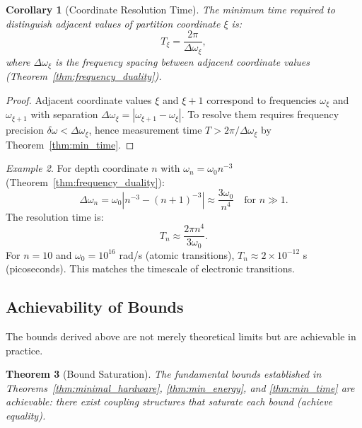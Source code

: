 \documentclass[twocolumn,10pt,a4paper]{article}
\newtheorem{theorem}{Theorem}[section]
\newtheorem{corollary}[theorem]{Corollary}
\theoremstyle{remark}
\newtheorem{example}[theorem]{Example}
\begin{document}
\begin{corollary}[Coordinate Resolution Time]
\label{cor:coord_time}
The minimum time required to distinguish adjacent values of partition coordinate $\xi$ is:
\begin{equation}
T_\xi = \frac{2\pi}{\Delta\omega_\xi},
\end{equation}
where $\Delta\omega_\xi$ is the frequency spacing between adjacent coordinate values (Theorem~\ref{thm:frequency_duality}).
\end{corollary}

\begin{proof}
Adjacent coordinate values $\xi$ and $\xi + 1$ correspond to frequencies $\omega_\xi$ and $\omega_{\xi+1}$ with separation $\Delta\omega_\xi = |\omega_{\xi+1} - \omega_\xi|$. To resolve them requires frequency precision $\delta\omega < \Delta\omega_\xi$, hence measurement time $T > 2\pi / \Delta\omega_\xi$ by Theorem~\ref{thm:min_time}.
\end{proof}

\begin{example}
For depth coordinate $n$ with $\omega_n = \omega_0 n^{-3}$ (Theorem~\ref{thm:frequency_duality}):
\begin{equation}
\Delta\omega_n = \omega_0 |n^{-3} - (n+1)^{-3}| \approx \frac{3\omega_0}{n^4} \quad \text{for } n \gg 1.
\end{equation}
The resolution time is:
\begin{equation}
T_n \approx \frac{2\pi n^4}{3\omega_0}.
\end{equation}
For $n = 10$ and $\omega_0 = 10^{16}$ rad/s (atomic transitions), $T_n \approx 2 \times 10^{-12}$ s (picoseconds). This matches the timescale of electronic transitions.
\end{example}

\subsection{Achievability of Bounds}

The bounds derived above are not merely theoretical limits but are achievable in practice.

\begin{theorem}[Bound Saturation]
\label{thm:bound_saturation}
The fundamental bounds established in Theorems~\ref{thm:minimal_hardware}, \ref{thm:min_energy}, and \ref{thm:min_time} are \emph{achievable}: there exist coupling structures that saturate each bound (achieve equality).
\end{theorem}
\end{document}
